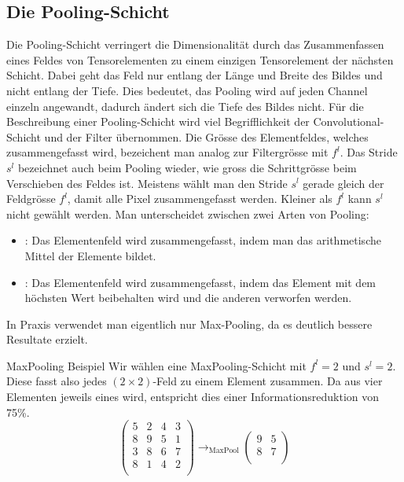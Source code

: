 \subsection{Die Pooling-Schicht}
Die Pooling-Schicht verringert die Dimensionalität durch das Zusammenfassen eines Feldes
von Tensorelementen zu einem einzigen Tensorelement der nächsten Schicht.
Dabei geht das Feld nur entlang der Länge und Breite des Bildes und
nicht entlang der Tiefe. Dies bedeutet, das Pooling wird auf jeden Channel
einzeln angewandt, dadurch ändert sich die Tiefe des Bildes nicht.
\para{}
Für die Beschreibung einer Pooling-Schicht wird viel Begrifflichkeit der
Convolutional-Schicht und der Filter übernommen.
Die Grösse des Elementfeldes, welches zusammengefasst wird, bezeichent man analog zur
Filtergrösse mit $f^l$. Das Stride $s^l$ bezeichnet auch beim Pooling wieder, wie
gross die Schrittgrösse beim Verschieben des Feldes ist. Meistens wählt man den
Stride $s^l$ gerade gleich der Feldgrösse $f^l$, damit alle Pixel
zusammengefasst werden. Kleiner als $f^l$ kann $s^l$ nicht gewählt werden.
\para{}
Man unterscheidet zwischen zwei Arten von Pooling:
\begin{itemize}
\item{: Das Elementenfeld wird zusammengefasst, indem
    man das arithmetische Mittel der Elemente bildet.}
\item{: Das Elementenfeld wird zusammengefasst, indem das
    Element mit dem höchsten Wert beibehalten wird und die anderen verworfen werden.}
\end{itemize}
In Praxis verwendet man eigentlich nur Max-Pooling, da es deutlich bessere
Resultate erzielt.
\begin{examplebox}{MaxPooling Beispiel}
  Wir wählen eine MaxPooling-Schicht mit $f^l = 2$ und $s^l = 2$.
  Diese fasst also jedes $(2 \times 2)$-Feld zu einem Element zusammen. Da aus
  vier Elementen jeweils eines wird, entspricht dies einer Informationsreduktion
  von 75\%.
  \para{}
  \begin{equation*}
    \begin{pmatrix}
      5 & 2 & 4 & 3 \\
      8 & 9 & 5 & 1 \\
      3 & 8 & 6 & 7 \\
      8 & 1 & 4 & 2 \\
    \end{pmatrix}
    \to_{\text{MaxPool}}
    \begin{pmatrix}
      9 & 5 \\
      8 & 7 \\
    \end{pmatrix}
  \end{equation*}
\end{examplebox}

